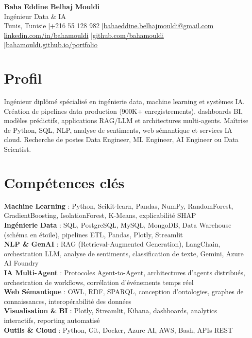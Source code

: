 \documentclass[a4paper,9pt]{article}
\begin{document}
\begin{center}
{\LARGE\bfseries\color{navy} Baha Eddine Belhaj Mouldi}\\[3pt]
{\large Ingénieur Data \& IA}\\[5pt]
Tunis, Tunisie \quad|\quad +216 55 128 982 \quad|\quad \href{mailto:bahaeddine.belhajmouldi@gmail.com}{bahaeddine.belhajmouldi@gmail.com}\\[1pt]
\href{https://www.linkedin.com/in/bahamouldi}{linkedin.com/in/bahamouldi} \quad|\quad \href{https://github.com/bahamouldi}{github.com/bahamouldi} \quad|\quad \href{https://bahamouldi.github.io/portfolio/}{bahamouldi.github.io/portfolio}
\end{center}
\vspace{1pt}
\section{Profil}
Ingénieur diplômé spécialisé en ingénierie data, machine learning et systèmes IA. Création de pipelines data production (900K+ enregistrements), dashboards BI, modèles prédictifs, applications RAG/LLM et architectures multi-agents. Maîtrise de Python, SQL, NLP, analyse de sentiments, web sémantique et services IA cloud. Recherche de postes Data Engineer, ML Engineer, AI Engineer ou Data Scientist.
\section{Compétences clés}
\textbf{Machine Learning} : Python, Scikit-learn, Pandas, NumPy, RandomForest, GradientBoosting, IsolationForest, K-Means, explicabilité SHAP\\[0.5pt]
\textbf{Ingénierie Data} : SQL, PostgreSQL, MySQL, MongoDB, Data Warehouse (schéma en étoile), pipelines ETL, Pandas, Plotly, Streamlit\\[0.5pt]
\textbf{NLP \& GenAI} : RAG (Retrieval-Augmented Generation), LangChain, orchestration LLM, analyse de sentiments, classification de texte, Gemini, Azure AI Foundry\\[0.5pt]
\textbf{IA Multi-Agent} : Protocoles Agent-to-Agent, architectures d'agents distribués, orchestration de workflows, corrélation d'événements temps réel\\[0.5pt]
\textbf{Web Sémantique} : OWL, RDF, SPARQL, conception d'ontologies, graphes de connaissances, interopérabilité des données\\[0.5pt]
\textbf{Visualisation \& BI} : Plotly, Streamlit, Kibana, dashboards, analytics interactifs, reporting automatisé\\[0.5pt]
\textbf{Outils \& Cloud} : Python, Git, Docker, Azure AI, AWS, Bash, APIs REST
\end{document}
